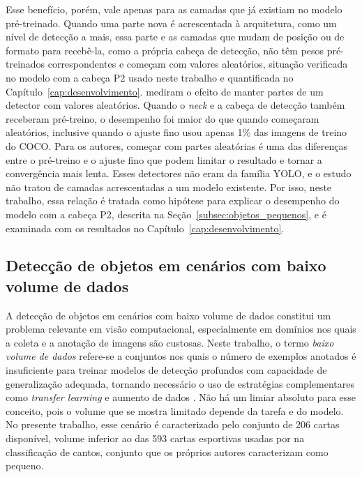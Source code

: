 \documentclass[
    12pt,                %
    openright,           %
    oneside,             %
    a4paper,             %
    english,             %
    brazil               %
]{abntex2}
\begin{document}
Esse benefício, porém, vale apenas para as camadas que já existiam no
modelo pré-treinado. Quando uma parte nova é acrescentada à
arquitetura, como um nível de detecção a mais, essa parte e as camadas
que mudam de posição ou de formato para recebê-la, como a própria cabeça de
detecção, não têm pesos pré-treinados correspondentes e começam com
valores aleatórios, situação verificada no modelo com a cabeça P2 usado neste trabalho
e quantificada no Capítulo~\ref{cap:desenvolvimento}. 
mediram o efeito de manter partes de um detector com valores
aleatórios. Quando o \textit{neck} e a cabeça de detecção também
receberam pré-treino, o desempenho foi maior do que quando começaram
aleatórios, inclusive quando o ajuste fino usou apenas 1\% das imagens
de treino do COCO. Para os autores, começar com partes aleatórias é uma
das diferenças entre o pré-treino e o ajuste fino que podem limitar o
resultado e tornar a convergência mais lenta. Esses detectores não eram
da família YOLO, e o estudo não tratou de camadas acrescentadas a um
modelo existente. Por isso, neste trabalho, essa relação é tratada como
hipótese para explicar o desempenho do modelo com a cabeça P2,
descrita na Seção~\ref{subsec:objetos_pequenos}, e é examinada com os
resultados no Capítulo~\ref{cap:desenvolvimento}.

\subsection{Detecção de objetos em cenários com baixo volume de dados}
\label{subsec:low_data_detection}

A detecção de objetos em cenários com baixo volume de dados constitui um
problema relevante em visão computacional, especialmente em domínios
nos quais a coleta e a anotação de imagens são custosas. Neste trabalho,
o termo \textit{baixo volume de dados} refere-se a conjuntos nos quais
o número de exemplos anotados é insuficiente para treinar modelos de
detecção profundos com capacidade de generalização adequada, tornando
necessário o uso de estratégias complementares como \textit{transfer
learning} e aumento de dados \cite{Chen2021}. Não há um limiar absoluto
para esse conceito, pois o volume que se mostra limitado depende da
tarefa e do modelo. No presente trabalho, esse cenário é caracterizado
pelo conjunto de 206 cartas disponível, volume inferior ao das 593
cartas esportivas usadas por  na classificação de
cantos, conjunto que os próprios autores caracterizam como pequeno.
\end{document}
